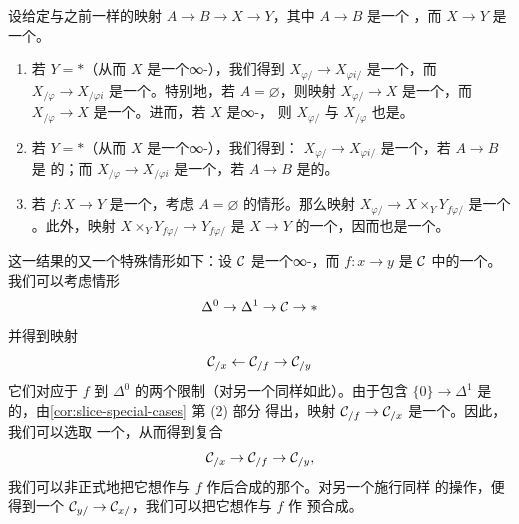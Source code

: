 \begin{corollary}\label{cor:slice-special-cases}
设给定与之前一样的映射 $A \to B \to X \to Y$，其中 $A \to B$ 是一个%
\trMonomorphism{}，而 $X \to Y$ 是一个\trInnerFibration{}。
\begin{enumerate}[label=(\arabic*)]
  \item 若 $Y = \ast$（从而 $X$ 是一个∞-\trCategory{}），我们得到
  $X_{\varphi/} \to X_{\varphi i/}$ 是一个\trLeftFibration{}，而
  $X_{/\varphi} \to X_{/\varphi i}$ 是一个\trRightFibration{}。特别地，若
  $A = \varnothing$，则映射 $X_{\varphi/} \to X$ 是一个\trLeftFibration{}，而
  $X_{/\varphi} \to X$ 是一个\trRightFibration{}。进而，若 $X$ 是∞-\trCategory{}，
  则 $X_{\varphi/}$ 与 $X_{/\varphi}$ 也是。
  \item 若 $Y = \ast$（从而 $X$ 是一个∞-\trCategory{}），我们得到：
  $X_{\varphi/} \to X_{\varphi i/}$ 是一个\trTrivialFibration{}，若 $A \to B$ 是%
  \trRightAnodyne{}的；而 $X_{/\varphi} \to X_{/\varphi i}$ 是一个\trTrivialFibration{}，若
  $A \to B$ 是\trLeftAnodyne{}的。
  \item 若 $f\colon X \to Y$ 是一个\trTrivialFibration{}，考虑 $A = \varnothing$
  的情形。那么映射 $X_{\varphi/} \to X \times_Y Y_{f \varphi/}$ 是一个%
  \trTrivialFibration{}。此外，映射 $X \times_Y Y_{f \varphi/} \to Y_{f \varphi/}$
  是 $X \to Y$ 的一个\trPullback{}，因而也是一个\trTrivialFibration{}。
\end{enumerate}
\end{corollary}

这一结果的又一个特殊情形如下：设 $\mathcal{C}$ 是一个∞-\trCategory{}，而
$f\colon x \to y$ 是 $\mathcal{C}$ 中的一个\trMorphism{}。我们可以考虑情形
\[
\Delta^0 \to \Delta^1 \to \mathcal{C} \to \ast
\]
并得到映射
\[
\mathcal{C}_{/x} \leftarrow \mathcal{C}_{/f} \to \mathcal{C}_{/y}
\]
它们对应于 $f$ 到 $\Delta^0$ 的两个限制（对另一个\trSlice{}同样如此）。由于包含
$\{0\} \to \Delta^1$ 是\trLeftAnodyne{}的，由\cref{cor:slice-special-cases} 第 (2) 部分
得出，映射 $\mathcal{C}_{/f} \to \mathcal{C}_{/x}$ 是一个\trTrivialFibration{}。因此，我们可以选取
一个\trSectionMap{}，从而得到复合
\[
\mathcal{C}_{/x} \to \mathcal{C}_{/f} \to \mathcal{C}_{/y},
\]
我们可以非正式地把它想作与 $f$ 作后合成的那个\trFunctor{}。对另一个\trSlice{}施行同样
的操作，便得到一个\trFunctor{} $\mathcal{C}_{y/} \to \mathcal{C}_{x/}$，我们可以把它想作与 $f$ 作
预合成。
